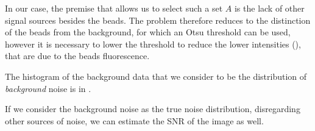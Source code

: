 \begin{marginfigure}
    \caption{
        The Otsu threshold leads to lower intensities of some beads to be passed as background. 
        On the left, side, Otsu threshold (\(\approx~0.13\)) is used and on the right, the it is lowered by \(0.07\) to 
            \(\approx~0.06\). 
        The top image shows a larger area of the difference of these two.
    }
\end{marginfigure}

In our case, the premise that allows us to select such a set \(A\) is the lack of other signal sources besides the
    beads.
The problem therefore reduces to the distinction of the beads from the background, for which an Otsu
    threshold can be used, however it is necessary to lower the threshold to reduce the lower
    intensities (), that are due to the beads fluorescence.

\begin{marginfigure}
    \caption{Histogram of the background noise. It is apparent that the threshold cuts off some of the data. This is due
    to a low \ac{SNR}.}
\end{marginfigure}
The histogram of the background data that we consider to be the distribution of \emph{background} noise is in
    .


If we consider the background noise as the true noise distribution, disregarding other sources of noise, we can 
    estimate the \ac{SNR} of the image as well.


